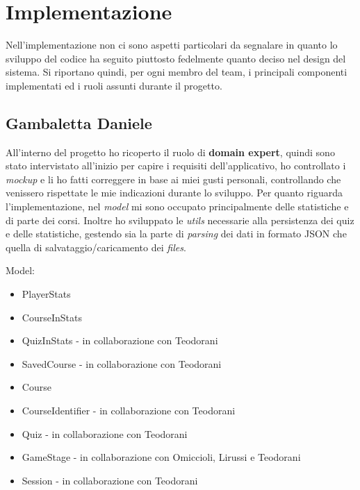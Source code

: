 
\chapter{Implementazione}\label{chap:impl}
Nell'implementazione non ci sono aspetti particolari da segnalare in quanto lo sviluppo del codice ha seguito piuttosto fedelmente quanto deciso nel design del sistema. Si riportano quindi, per ogni membro del team, i principali componenti implementati ed i ruoli assunti durante il progetto.

\section{Gambaletta Daniele}
    All'interno del progetto ho ricoperto il ruolo di \textbf{domain expert}, quindi sono stato intervistato all'inizio per capire i requisiti dell'applicativo, ho controllato i \textit{mockup} e li ho fatti correggere in base ai miei gusti personali, controllando che venissero rispettate le mie indicazioni durante lo sviluppo.
    Per quanto riguarda l'implementazione, nel \textit{model} mi sono occupato principalmente delle statistiche e di parte dei corsi. Inoltre ho sviluppato le \textit{utils} necessarie alla persistenza dei quiz e delle statistiche, gestendo sia la parte di \textit{parsing} dei dati in formato JSON che quella di salvataggio/caricamento dei \textit{files}. 
    
    Model:
    \begin{itemize}
        \item PlayerStats
        \item CourseInStats
        \item QuizInStats - in collaborazione con Teodorani
        \item SavedCourse - in collaborazione con Teodorani
        \item Course
        \item CourseIdentifier - in collaborazione con Teodorani
        \item Quiz - in collaborazione con Teodorani
        \item GameStage - in collaborazione con Omiccioli, Lirussi e Teodorani
        \item Session - in collaborazione con Teodorani
    \end{itemize}

